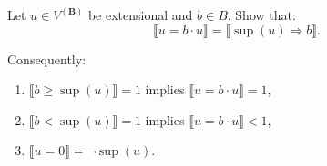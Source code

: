Let $u \in V^{(\mathbf{B})}$ be extensional and $b \in B$. Show that:
$$\llbracket u = b \cdot u \rrbracket = \llbracket \sup(u) \Rightarrow b \rrbracket.$$

Consequently:
\begin{enumerate}
\item $\llbracket b \geq \sup(u) \rrbracket = 1$ implies $\llbracket u = b \cdot u \rrbracket = 1$,
\item $\llbracket b < \sup(u) \rrbracket = 1$ implies $\llbracket u = b \cdot u \rrbracket < 1$,
\item $\llbracket u = 0 \rrbracket = \neg \sup(u)$.
\end{enumerate}
